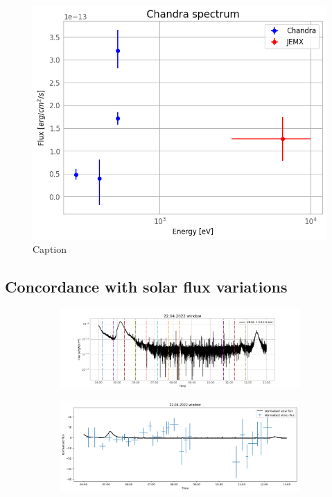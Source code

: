     \begin{figure}[H]
        \centering
        \includegraphics[width = 12cm]{report/Figures/results/spectra_comp.png}
        \caption{Caption}
        \label{comp_spec}
    \end{figure}
    
    \subsection{Concordance with solar flux variations}

    \begin{figure}[H]
        \centering
        \begin{subfigure}{\textwidth}
            \includegraphics[width=\textwidth]{report/Figures/results/GOES_22.png}
        \end{subfigure}%
        \hspace{1em}
        \begin{subfigure}{\textwidth}
            \centering
            \includegraphics[width=\textwidth]{report/Figures/results/norm_22.png}
        \end{subfigure}
        \caption{}
        \label{goes22}
    \end{figure}

